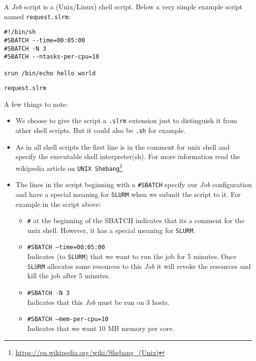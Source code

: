 \documentclass[a4paper,11pt]{article}
\begin{document}
A \textit{Job} script is a (Unix/Linux) shell script. Below a very simple example script named \texttt{request.slrm}: 

\begin{listing}
    \begin{verbatim}
#!/bin/sh
#SBATCH --time=00:05:00
#SBATCH -N 3
#SBATCH --ntasks-per-cpu=10

srun /bin/echo hello world
    \end{verbatim}
    \caption{\texttt{request.slrm}}
\end{listing}


A few things to note:
\begin{itemize}
    \item We choose to give the script a \texttt{.slrm} extension just to distinguish it from other shell scripts. But it could also be \texttt{.sh} for example.
    \item As in all shell scripts the first line is in the comment for unix shell and specify the executable shell interpreter(sh). For more information read the wikipedia article on \texttt{UNIX Shebang}\footnote{\url{https://en.wikipedia.org/wiki/Shebang\_(Unix)}}
    \item The lines in the script beginning with a \verb|#|\texttt{SBATCH} specify our \textit{Job} configuration and have a special meaning for \texttt{SLURM} when we submit the script to it. For example in the script above:
        \begin{itemize}
            \item \verb|#| at the beginning of the SBATCH indicates that its a comment for the unix shell. However, it has a special meaning for \texttt{SLURM}.
            \item \verb|#|\texttt{SBATCH --time=00:05:00}\\ Indicates (to \texttt{SLURM}) that we want to run the job for 5 minutes. Once \texttt{SLURM} allocates some resources to this \textit{Job} it will revoke the resources and kill the job after 5 minutes.
            \item \verb|#|\texttt{SBATCH -N 3} \\Indicates that this \textit{Job} must be run on 3 hosts.
            \item \verb|#|\texttt{SBATCH --mem-per-cpu=10}\\ Indicates that we want 10 MB memory per core.

\end{itemize}
\end{itemize}
\end{document}
